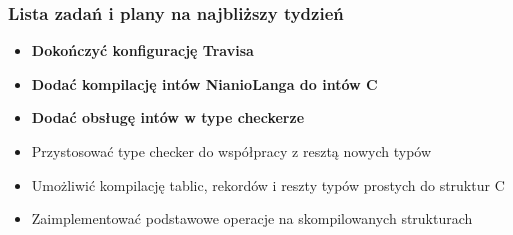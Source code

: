 \documentclass{beamer}
\begin{document}
	\begin{frame}
		\frametitle{Lista zadań i plany na najbliższy tydzień}
		\begin{itemize}
			\item{\textbf{Dokończyć konfigurację Travisa}}
			\item{\textbf{Dodać kompilację intów NianioLanga do intów C}}
			\item{\textbf{Dodać obsługę intów w type checkerze}}
			\item{Przystosować type checker do współpracy z resztą nowych typów}
			\item{Umożliwić kompilację tablic, rekordów i reszty typów prostych do struktur C}
			\item{Zaimplementować podstawowe operacje na skompilowanych strukturach}
		\end{itemize}
	\end{frame}
\end{document}
